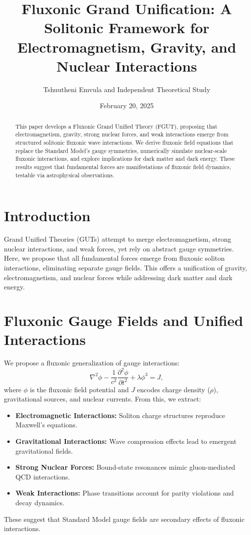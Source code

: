 \documentclass{article}
\title{Fluxonic Grand Unification: A Solitonic Framework for Electromagnetism, Gravity, and Nuclear Interactions}
\author{Tshuutheni Emvula and Independent Theoretical Study}
\date{February 20, 2025}
\begin{document}
\maketitle

\begin{abstract}
This paper develops a Fluxonic Grand Unified Theory (FGUT), proposing that electromagnetism, gravity, strong nuclear forces, and weak interactions emerge from structured solitonic fluxonic wave interactions. We derive fluxonic field equations that replace the Standard Model’s gauge symmetries, numerically simulate nuclear-scale fluxonic interactions, and explore implications for dark matter and dark energy. These results suggest that fundamental forces are manifestations of fluxonic field dynamics, testable via astrophysical observations.
\end{abstract}

\section{Introduction}
Grand Unified Theories (GUTs) attempt to merge electromagnetism, strong nuclear interactions, and weak forces, yet rely on abstract gauge symmetries. Here, we propose that all fundamental forces emerge from fluxonic soliton interactions, eliminating separate gauge fields. This offers a unification of gravity, electromagnetism, and nuclear forces while addressing dark matter and dark energy.

\section{Fluxonic Gauge Fields and Unified Interactions}
We propose a fluxonic generalization of gauge interactions:
\begin{equation}
    \nabla^2 \phi - \frac{1}{c^2} \frac{\partial^2 \phi}{\partial t^2} + \lambda \phi^3 = J,
\end{equation}
where \(\phi\) is the fluxonic field potential and \(J\) encodes charge density (\(\rho\)), gravitational sources, and nuclear currents. From this, we extract:
\begin{itemize}
    \item \textbf{Electromagnetic Interactions:} Soliton charge structures reproduce Maxwell’s equations.
    \item \textbf{Gravitational Interactions:} Wave compression effects lead to emergent gravitational fields.
    \item \textbf{Strong Nuclear Forces:} Bound-state resonances mimic gluon-mediated QCD interactions.
    \item \textbf{Weak Interactions:} Phase transitions account for parity violations and decay dynamics.
\end{itemize}
These suggest that Standard Model gauge fields are secondary effects of fluxonic interactions.
\end{document}
